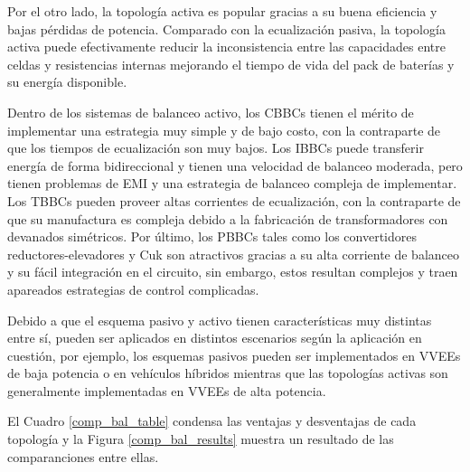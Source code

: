Por el otro lado, la topolog\'ia activa es popular gracias a su buena eficiencia
y bajas p\'erdidas de potencia. Comparado con la ecualizaci\'on pasiva, la
topolog\'ia activa puede efectivamente reducir la inconsistencia entre las
capacidades entre celdas y resistencias internas mejorando el tiempo de vida del
pack de bater\'ias y su energ\'ia disponible.

Dentro de los sistemas de balanceo activo, los \acrshort{CBBC}s tienen el
m\'erito de implementar una estrategia muy simple y de bajo costo, con la
contraparte de que los tiempos de ecualizaci\'on son muy bajos. Los
\acrshort{IBBC}s puede transferir energ\'ia de forma bidireccional y tienen una
velocidad de balanceo moderada, pero tienen problemas de \acrshort{EMI} y una
estrategia de balanceo compleja de implementar. Los \acrshort{TBBC}s pueden 
proveer altas corrientes de ecualizaci\'on, con la contraparte de que su 
manufactura es compleja debido a la fabricaci\'on de transformadores con 
devanados sim\'etricos. Por \'ultimo, los \acrshort{PBBC}s tales como los
convertidores reductores-elevadores y Cuk son atractivos gracias a su alta
corriente de balanceo y su f\'acil integraci\'on en el circuito, sin embargo,
estos resultan complejos y traen apareados estrategias de control complicadas.

Debido a que el esquema pasivo y activo tienen caracter\'isticas muy distintas
entre s\'i, pueden ser aplicados en distintos escenarios seg\'un la aplicaci\'on
en cuesti\'on, por ejemplo, los esquemas pasivos pueden ser implementados en
\acrshort{VVEE}s de baja potencia o en veh\'iculos h\'ibridos mientras que las
topolog\'ias activas son generalmente implementadas en \acrshort{VVEE}s de alta
potencia.

El Cuadro \ref{comp_bal_table} condensa las ventajas y desventajas de cada
topolog\'ia y la Figura \ref{comp_bal_results} muestra un resultado de las
comparanciones entre ellas. 

